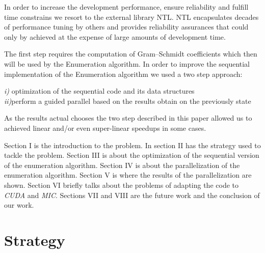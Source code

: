 \documentclass[conference]{IEEEtran}
\begin{document}
    In order to increase the development performance, ensure reliability and fulfill time constrains we resort to the external library NTL. NTL encapsulates decades of performance tuning by others and provides reliability assurances that could only by achieved at the expense of large amounts of development time.
    
    The first step requires the computation of Gram–Schmidt coefficients which then will be used by the Enumeration algorithm. In order to improve the sequential implementation of the Enumeration algorithm we used a two step approach:    
    
    \emph{i)} optimization of the sequential code and its data structures\\
    \indent \emph{ii)}perform a guided parallel based on the results obtain on the previously state
    
    
    As the results actual chooses the two step described in this paper allowed us to achieved linear and/or even super-linear speedups in some cases.
  
   Section I is the introduction to the problem. In section II has the strategy used to tackle the problem. Section III is about the optimization of the sequential version of the enumeration algorithm. Section IV is about the parallelization of the enumeration algorithm. Section V is where the results of the parallelization are shown. Section VI briefly talks about the problems of adapting the code to \emph{CUDA} and \emph{MIC}. Sections VII and VIII are the future work and the conclusion of our work.
 
\section{Strategy}
 
 
 
\end{document}
